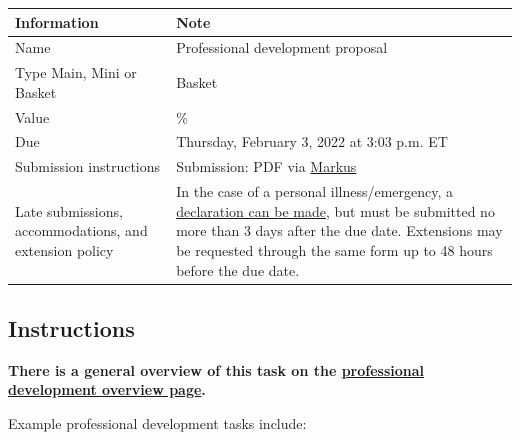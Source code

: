 \documentclass[
  openany]{book}
\begin{document}
\begin{longtable}[]{@{}
  >{\raggedright\arraybackslash}p{}
  >{\raggedright\arraybackslash}p{}@{}}
\toprule
\textbf{Information} & \textbf{Note} \\
\midrule
\endhead
Name & Professional development proposal \\
Type Main, Mini or Basket & Basket \\
Value & 1\% \\
Due & Thursday, February 3, 2022 at 3:03 p.m. ET \\
Submission instructions & Submission: PDF via \href{https://markus-ds.teach.cs.toronto.edu/}{Markus} \\
Late submissions, accommodations, and extension policy & In the case of a personal illness/emergency, a \href{https://forms.office.com/Pages/ResponsePage.aspx?id=JsKqeAMvTUuQN7RtVsVSEOKHUU3SzAJJhmOKjJhDWEpUNTFDSzhZTFlXUzVYMVlNM1FEUTRZMkVWOC4u}{declaration can be made}, but must be submitted no more than 3 days after the due date. Extensions may be requested through the same form up to 48 hours before the due date. \\
\bottomrule
\end{longtable}

\hypertarget{instructions-5}{%
\subsection{Instructions}\label{instructions-5}}

\textbf{There is a general overview of this task on the \href{https://q.utoronto.ca/courses/204826/pages/professional-development}{professional development overview page}.}

Example professional development tasks include:
\end{document}
